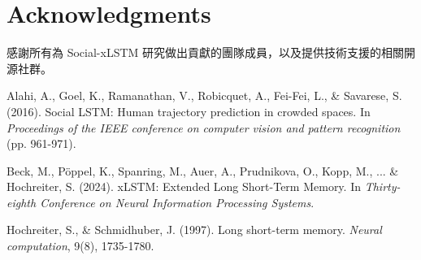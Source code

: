 \documentclass[11pt,a4paper]{article}
\begin{document}
\section*{Acknowledgments}

感謝所有為 Social-xLSTM 研究做出貢獻的團隊成員，以及提供技術支援的相關開源社群。

\begin{thebibliography}{9}

Alahi, A., Goel, K., Ramanathan, V., Robicquet, A., Fei-Fei, L., \& Savarese, S. (2016). 
Social LSTM: Human trajectory prediction in crowded spaces. 
In \textit{Proceedings of the IEEE conference on computer vision and pattern recognition} (pp. 961-971).

Beck, M., Pöppel, K., Spanring, M., Auer, A., Prudnikova, O., Kopp, M., ... \& Hochreiter, S. (2024). 
xLSTM: Extended Long Short-Term Memory. 
In \textit{Thirty-eighth Conference on Neural Information Processing Systems}.

Hochreiter, S., \& Schmidhuber, J. (1997). 
Long short-term memory. 
\textit{Neural computation}, 9(8), 1735-1780.

\end{thebibliography}
\end{document}
